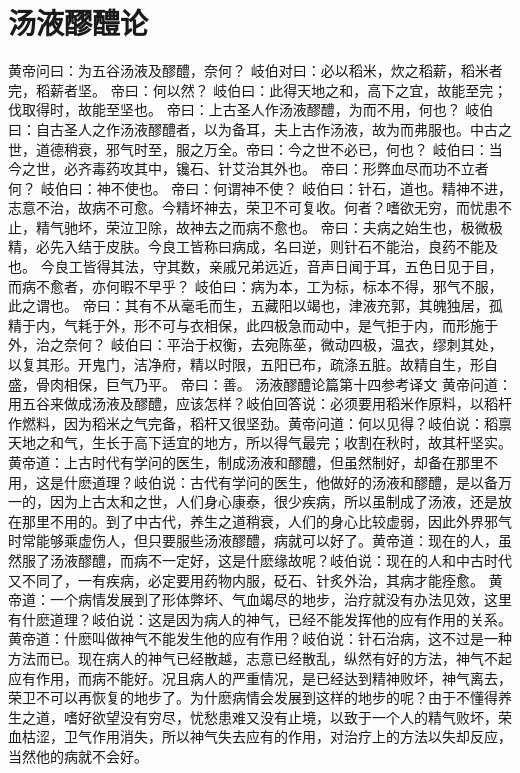 \documentclass[a4paper,12pt,UTF8,twoside]{ctexbook}
\begin{document}
\chapter{汤液醪醴论}
黄帝问曰：为五谷汤液及醪醴，奈何？
岐伯对曰：必以稻米，炊之稻薪，稻米者完，稻薪者坚。
帝曰：何以然？
岐伯曰：此得天地之和，高下之宜，故能至完；伐取得时，故能至坚也。
帝曰：上古圣人作汤液醪醴，为而不用，何也？
岐伯曰：自古圣人之作汤液醪醴者，以为备耳，夫上古作汤液，故为而弗服也。中古之世，道德稍衰，邪气时至，服之万全。帝曰：今之世不必已，何也？
岐伯曰：当今之世，必齐毒药攻其中，镵石、针艾治其外也。
帝曰：形弊血尽而功不立者何？
岐伯曰：神不使也。
帝曰：何谓神不使？
岐伯曰：针石，道也。精神不进，志意不治，故病不可愈。今精坏神去，荣卫不可复收。何者？嗜欲无穷，而忧患不止，精气驰坏，荣泣卫除，故神去之而病不愈也。
帝曰：夫病之始生也，极微极精，必先入结于皮肤。今良工皆称曰病成，名曰逆，则针石不能治，良药不能及也。
今良工皆得其法，守其数，亲戚兄弟远近，音声日闻于耳，五色日见于目，而病不愈者，亦何暇不早乎？
岐伯曰：病为本，工为标，标本不得，邪气不服，此之谓也。
帝曰：其有不从毫毛而生，五藏阳以竭也，津液充郭，其魄独居，孤精于内，气耗于外，形不可与衣相保，此四极急而动中，是气拒于内，而形施于外，治之奈何？
岐伯曰：平治于权衡，去宛陈莝，微动四极，温衣，缪刺其处，以复其形。开鬼门，洁净府，精以时限，五阳已布，疏涤五脏。故精自生，形自盛，骨肉相保，巨气乃平。
帝曰：善。
汤液醪醴论篇第十四参考译文
黄帝问道：用五谷来做成汤液及醪醴，应该怎样？岐伯回答说：必须要用稻米作原料，以稻杆作燃料，因为稻米之气完备，稻杆又很坚劲。黄帝问道：何以见得？岐伯说：稻禀天地之和气，生长于高下适宜的地方，所以得气最完；收割在秋时，故其杆坚实。
黄帝道：上古时代有学问的医生，制成汤液和醪醴，但虽然制好，却备在那里不用，这是什麽道理？岐伯说：古代有学问的医生，他做好的汤液和醪醴，是以备万一的，因为上古太和之世，人们身心康泰，很少疾病，所以虽制成了汤液，还是放在那里不用的。到了中古代，养生之道稍衰，人们的身心比较虚弱，因此外界邪气时常能够乘虚伤人，但只要服些汤液醪醴，病就可以好了。黄帝道：现在的人，虽然服了汤液醪醴，而病不一定好，这是什麽缘故呢？岐伯说：现在的人和中古时代又不同了，一有疾病，必定要用药物内服，砭石、针炙外治，其病才能痊愈。
黄帝道：一个病情发展到了形体弊坏、气血竭尽的地步，治疗就没有办法见效，这里有什麽道理？岐伯说：这是因为病人的神气，已经不能发挥他的应有作用的关系。黄帝道：什麽叫做神气不能发生他的应有作用？岐伯说：针石治病，这不过是一种方法而已。现在病人的神气已经散越，志意已经散乱，纵然有好的方法，神气不起应有作用，而病不能好。况且病人的严重情况，是已经达到精神败坏，神气离去，荣卫不可以再恢复的地步了。为什麽病情会发展到这样的地步的呢？由于不懂得养生之道，嗜好欲望没有穷尽，忧愁患难又没有止境，以致于一个人的精气败坏，荣血枯涩，卫气作用消失，所以神气失去应有的作用，对治疗上的方法以失却反应，当然他的病就不会好。
\end{document}
